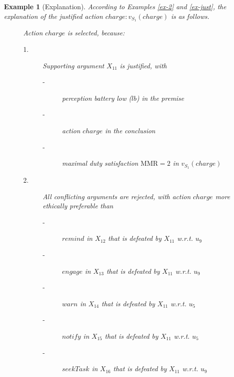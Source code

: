 \documentclass[letterpaper]{article} %
\newtheorem{definition}{Definition}
\newtheorem{example}{Example}
\newtheorem{proposition}{Proposition}
\begin{document}
\begin{example}[Explanation]
According to Examples \ref{ex-2} and \ref{ex-just}, the explanation of the justified action $charge: v_{S_1}(charge)$ is as follows. 
\begin{description}
\item[] Action $charge$ is selected, because:
\begin{description}
\item[1.] Supporting argument $X_{11}$ is justified, with
\begin{description}
\item[-]perception battery low ($lb$) in the premise
\item[-]action $charge$ in the conclusion
\item[-]maximal duty satisfaction $\mathrm{MMR} = 2$ in $v_{S_1}(charge)$
\end{description}
\item[2.] All conflicting arguments are rejected, with action $charge$ more ethically preferable than
\begin{description}
\item[-] $remind$ in $X_{12}$ that is defeated by $X_{11}$ w.r.t. $u_9$
\item[-] $engage$ in $X_{13}$ that is defeated by $X_{11}$  w.r.t. $u_9$
\item[-] $warn$ in $X_{14}$ that is defeated by $X_{11}$  w.r.t. $u_5$
\item[-] $notify$ in $X_{15}$ that is defeated by $X_{11}$  w.r.t. $u_5$
\item[-] $seekTask$ in $X_{16}$ that is defeated by $X_{11}$  w.r.t. $u_9$
\end{description}
\end{description}
\end{description}
\end{example}




\end{document}
